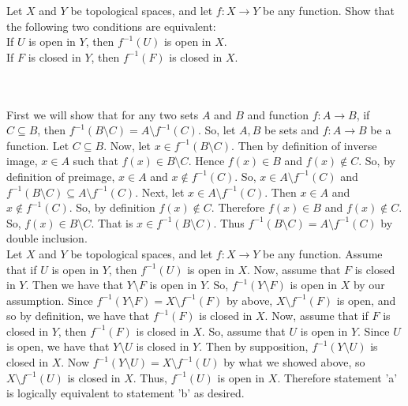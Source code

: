 Let $X$ and $Y$ be topological spaces, and let $f:X\to Y$ be any function. Show that the following two
conditions are equivalent:\\
If $U$ is open in $Y$, then $f^{-1}(U)$ is open in $X$.\\
If $F$ is closed in $Y$, then $f^{-1}(F)$ is closed in $X$.\\\\

\begin{solution}\renewcommand{\qedsymbol}{}\ \\
    First we will show that for any two sets $A$ and $B$ and function $f:A\rightarrow B$, if
    $C\subseteq B$, then $f^{-1}(B\setminus C)=A\setminus f^{-1}(C)$. So, let $A,B$ be sets and
    $f:A\rightarrow B$ be a function. Let $C\subseteq B$. Now, let $x\in f^{-1}(B\setminus C)$. Then by
    definition of inverse image, $x\in A$ such that $f(x)\in B\setminus C$. Hence $f(x)\in B$ and
    $f(x)\notin C$. So, by definition of preimage, $x\in A$ and $x\notin f^{-1}(C)$. So,
    $x\in A\setminus f^{-1}(C)$ and $f^{-1}(B\setminus C)\subseteq A\setminus f^{-1}(C)$. Next, let
    $x\in A\setminus f^{-1}(C)$. Then $x\in A$ and $x\notin f^{-1}(C)$. So, by definition
    $f(x)\notin C$. Therefore $f(x)\in B$ and $f(x)\notin C$. So, $f(x)\in B\setminus C$. That is
    $x\in f^{-1}(B\setminus C)$. Thus $f^{-1}(B\setminus C)=A\setminus f^{-1}(C)$ by double inclusion.\\
    
    Let $X$ and $Y$ be topological spaces, and let $f:X\to Y$ be any function. Assume that if $U$ is
    open in $Y$, then $f^{-1}(U)$ is open in $X$. Now, assume that $F$ is closed in $Y$. Then we have
    that $Y\setminus F$ is open in $Y$. So, $f^{-1}(Y\setminus F)$ is open in $X$ by our assumption.
    Since $f^{-1}(Y\setminus F)=X\setminus f^{-1}(F)$ by above, $X\setminus f^{-1}(F)$ is open, and so
    by definition, we have that $f^{-1}(F)$ is closed in $X$. Now, assume that if $F$ is closed in $Y$,
    then $f^{-1}(F)$ is closed in $X$. So, assume that $U$ is open in $Y$. Since $U$ is open, we have
    that $Y\setminus U$ is closed in $Y$. Then by supposition, $f^{-1}(Y\setminus U)$ is closed in $X$.
    Now $f^{-1}(Y\setminus U)=X\setminus f^{-1}(U)$ by what we showed above, so $X\setminus f^{-1}(U)$
    is closed in $X$. Thus, $f^{-1}(U)$ is open in $X$. Therefore statement 'a' is logically equivalent
    to statement 'b' as desired.

\end{solution}